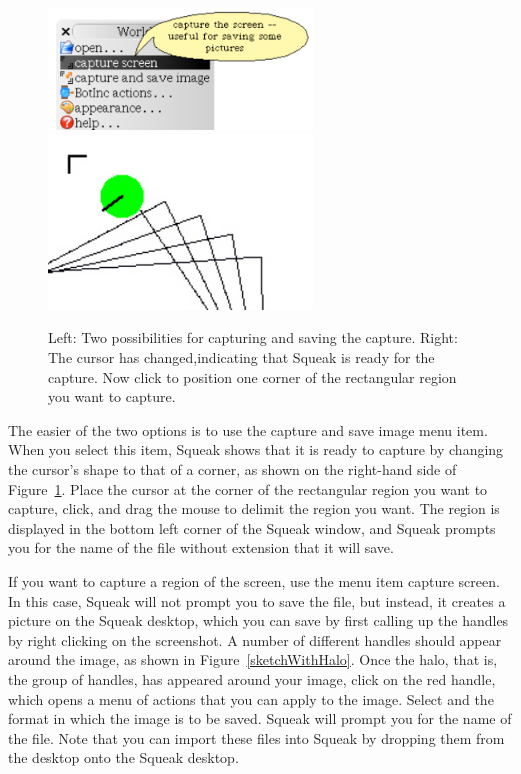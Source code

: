 \documentclass[a4paper,10pt,twoside]{book}
\begin{document}
\begin{figure}[h]
\begin{center}
\includegraphics[width=7cm]{screenCapture}\includegraphics[width=7cm]{positioningScreen}
\caption{Left: Two possibilities for capturing and saving the capture. Right: The cursor has changed,indicating that Squeak is ready for the capture. Now click to position one corner of the rectangular region you want to capture.}\label{screenCapture}
\end{center}
\end{figure}


The easier of the two options is to use the capture and save image menu item. When you 
select this item, Squeak shows that it is ready to capture by changing the cursor’s shape to that 
of a corner, as shown on the right-hand side of Figure~\ref{screenCapture}. Place the cursor at the corner of the 
rectangular region you want to capture, click, and drag the mouse to delimit the region you 
want. The region is displayed in the bottom left corner of the Squeak window, and Squeak 
prompts you for the name of the file without extension that it will save. 

If you want to capture a region of the screen, use the menu item capture screen. In this 
case, Squeak will not prompt you to save the file, but instead, it creates a picture on the Squeak 
desktop, which you can save by first calling up the handles by right clicking on the screenshot. 
A number of different handles should appear around the image, as shown in Figure~\ref{sketchWithHalo}. Once 
the halo, that is, the group of handles, has appeared around your image, click on the red handle, 
which opens a menu of actions that you can apply to the image. Select  and the format in 
which the image is to be saved. Squeak will prompt you for the name of the file. Note that you 
can import these files into Squeak by dropping them from the desktop onto the Squeak desktop. 
\end{document}
